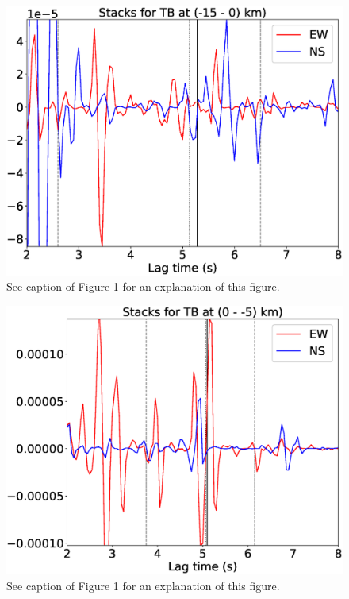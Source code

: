 \documentclass[letterpaper, 12pt]{article}
\begin{document}
\begin{figure}[H]
\includegraphics[width=\linewidth]{figures/intervals/TB_-15_000_stacks.eps}
\caption{See caption of Figure 1 for an explanation of this figure.}
\end{figure}

\begin{figure}[H]
\includegraphics[width=\linewidth]{figures/intervals/TB_000_-05_stacks.eps}
\caption{See caption of Figure 1 for an explanation of this figure.}
\end{figure}
\end{document}
